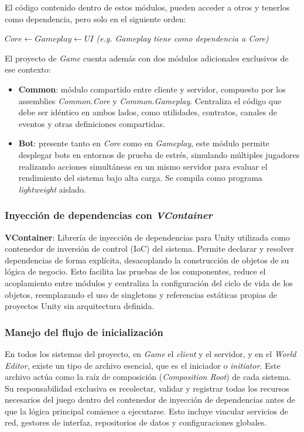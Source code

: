 El código contenido dentro de estos módulos, pueden acceder a otros y tenerlos como dependencia, pero solo en el siguiente orden:

\begin{center}
    $Core \leftarrow Gameplay \leftarrow UI$ \textit{(e.g. Gameplay tiene como dependencia a Core)}
\end{center}

El proyecto de \textit{Game} cuenta además con dos módulos adicionales exclusivos de ese contexto:

\begin{itemize}
  \item \textbf{Common}: módulo compartido entre cliente y servidor, compuesto por los assemblies 
  \textit{Common.Core} y \textit{Common.Gameplay}. Centraliza el código que debe ser idéntico en ambos 
  lados, como utilidades, contratos, canales de eventos y otras definiciones compartidas.
  \item \textbf{Bot}: presente tanto en \textit{Core} como en \textit{Gameplay}, este módulo permite 
  desplegar bots en entornos de prueba de estrés, simulando múltiples jugadores realizando acciones 
  simultáneas en un mismo servidor para evaluar el rendimiento del sistema bajo alta carga. 
        Se compila como programa \textit{lightweight} aislado.
\end{itemize}

\subsubsection{Inyección de dependencias con \textit{VContainer}}

\textbf{VContainer}: Librería de inyección de dependencias para Unity utilizada como contenedor 
de inversión de control (IoC) del sistema. Permite declarar y resolver dependencias de forma explícita, 
desacoplando la construcción de objetos de su lógica de negocio. Esto facilita las pruebas de los 
componentes, reduce el acoplamiento entre módulos y centraliza la configuración del ciclo de vida de 
los objetos, reemplazando el uso de singletons y referencias estáticas propias de proyectos Unity 
sin arquitectura definida.

\subsubsection{Manejo del flujo de inicialización}

En todos los sistemas del proyecto, en \textit{Game} el \textit{client} y el servidor, y en el 
\textit{World Editor}, existe un tipo de archivo esencial, que es el iniciador o \textit{initiator}. Este archivo 
actúa como la raíz de composición (\textit{Composition Root}) de cada sistema. Su responsabilidad exclusiva 
es recolectar, validar y registrar todas los recursos necesarios del juego dentro del contenedor de inyección 
de dependencias antes de que la lógica principal comience a ejecutarse. 
Esto incluye vincular servicios de red, gestores de interfaz, repositorios de datos y configuraciones globales.

